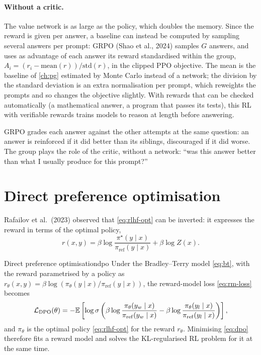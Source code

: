\paragraph{Without a critic.} The value network is as large as the policy,
which doubles the memory. Since the reward is given per answer, a baseline
can instead be computed by sampling several answers per prompt: GRPO (Shao
et al., 2024) samples $G$ answers, and uses as advantage of each answer its
reward standardised within the group, $A_i = (r_i - \mathrm{mean}(r)) /
\mathrm{std}(r)$, in the clipped PPO objective. The mean is the baseline of
\cref{ch:pg} estimated by Monte Carlo instead of a network; the division by
the standard deviation is an extra normalisation per prompt, which
reweights the prompts and so changes the objective slightly. With rewards
that can be checked automatically (a mathematical answer, a program that
passes its tests), this RL with verifiable rewards trains models to
reason at length before answering.

\begin{intuition}
  GRPO grades each answer against the other attempts at the same question:
  an answer is reinforced if it did better than its siblings, discouraged
  if it did worse. The group plays the role of the critic, without a
  network: ``was this answer better than what I usually produce for this
  prompt?''
\end{intuition}

\section{Direct preference optimisation}

Rafailov et al.\ (2023) observed that \eqref{eq:rlhf-opt} can be inverted:
it expresses the reward in terms of the optimal policy,
\begin{equation}
  r(x, y) = \beta \log \frac{\pi^\star(y \mid x)}{\pi_{\mathrm{ref}}(y \mid
  x)} + \beta \log Z(x).
\end{equation}

\begin{theorem}{Direct preference optimisation}{dpo}
  Under the Bradley--Terry model \eqref{eq:bt}, with the reward
  parametrised by a policy as $r_\theta(x, y) = \beta \log (\pi_\theta(y
  \mid x) / \pi_{\mathrm{ref}}(y \mid x))$, the reward-model loss
  \eqref{eq:rm-loss} becomes
  \begin{equation}
    \label{eq:dpo}
    \mathcal{L}_{\mathrm{DPO}}(\theta) = -\mathbb{E}\left[ \log \sigma\left( \beta
    \log \frac{\pi_\theta(y_w \mid x)}{\pi_{\mathrm{ref}}(y_w \mid x)} -
    \beta \log \frac{\pi_\theta(y_l \mid x)}{\pi_{\mathrm{ref}}(y_l \mid x)}
    \right) \right],
  \end{equation}
  and $\pi_\theta$ is the optimal policy \eqref{eq:rlhf-opt} for the reward
  $r_\theta$. Minimising \eqref{eq:dpo} therefore fits a reward model and
  solves the KL-regularised RL problem for it at the same time.
\end{theorem}

